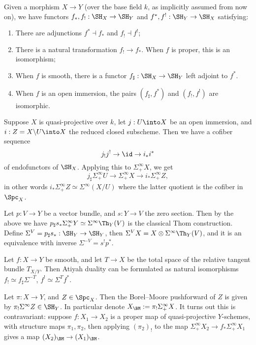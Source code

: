 Given a morphism $X\to Y$ (over the base field $k$, as implicitly assumed from now on), we have functors $f_*,f_!:\SH_X\to \SH_Y$ and $f^*,f^!:\SH_Y\to \SH_X$ satisfying:
\begin{enumerate}
\item There are adjunctions $f^* \dashv f_*$ and $f_! \dashv f^!$;
\item There is a natural transformation $f_!\to f_*$. When $f$ is proper, this is an isomorphism;
\item When $f$ is smooth, there is a functor $f_\sharp: \SH_X\to \SH_Y$ left adjoint to $f^*$.
\item When $f$ is an open immersion, the pairs $(f_\sharp, f^*)$ and $(f_!,f^!)$ are isomorphic.
\end{enumerate}


\begin{exm}
	Suppose $X$ is quasi-projective over $k$, let $j:U\into X$ be an open immersion, and $i:Z=X\backslash U\into X$ the reduced closed subscheme. Then we have a cofiber sequence
	\[j_!j^! \to \id \to i_*i^*\] 
	of endofunctors of $\SH_X$. Applying this to $\Sigma^\infty_+ X$, we get
	\[j_\sharp\Sigma^\infty_+ U \to \Sigma^\infty_+ X \to i_*\Sigma^\infty_+ Z,\]
	in other words $i_*\Sigma^\infty_+ Z \simeq \Sigma^\infty(X/U)$ where the latter quotient is the cofiber in $\Spc_X$.
\end{exm}

\begin{exm}
	Let $p:V\to Y$ be a vector bundle, and $s:Y\to V$ the zero section. Then by the above we have $p_\sharp s_*\Sigma^\infty_+ Y \simeq \Sigma^\infty\Th_Y (V)$ is the classical Thom construction. Define $\Sigma^V = p_\sharp s_* :\SH_Y\to \SH_Y$, then $\Sigma^VX=X\otimes \Sigma^\infty\Th_Y(V)$, and it is an equivalence with inverse $\Sigma^{-V}=s^!p^*$.
\end{exm}

\begin{exm}
Let $f:X\to Y$ be smooth, and let $T\to X$ be the total space of the relative tangent bundle $T_{X/Y}$. Then Atiyah duality can be formulated as natural isomorphisms $f_! \simeq f_\sharp \Sigma^{-T}$, $f^!\simeq \Sigma^T f^*$.
\end{exm}

\begin{exm}
Let $\pi:X\to Y$, and $Z\in \Spc_X$. Then the Borel--Moore pushforward of $Z$ is given by $\pi_!\Sigma^\infty Z\in \SH_Y$. In particular denote $X_{\BM}:= \pi_!\Sigma^\infty_+ X$. It turns out this is contravariant: suppose $f:X_1\to X_2$ is a proper map of quasi-projective $Y$-schemes, with structure maps $\pi_1,\pi_2$, then applying $(\pi_2)_!$ to the map $\Sigma^\infty_+X_2\to f_*\Sigma_+^\infty X_1$ gives a map $(X_2)_{\BM}\to (X_1)_{\BM}$.
\end{exm}




